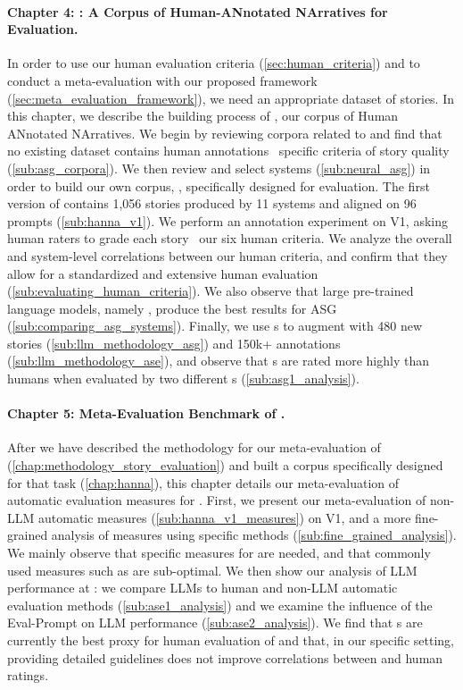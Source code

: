 \paragraph{Chapter 4: \hanna: A Corpus of Human-ANnotated NArratives for {\asg} Evaluation.}
In order to use our human evaluation criteria (\autoref{sec:human_criteria}) and to conduct a meta-evaluation with our proposed framework (\autoref{sec:meta_evaluation_framework}), we need an appropriate dataset of stories. In this chapter, we describe the building process of {\hanna}, our corpus of Human ANnotated NArratives. We begin by reviewing  corpora related to {\asgfull} and find that no existing dataset contains human annotations {\wrt}\ specific criteria of story quality (\autoref{sub:asg_corpora}). We then review and select {\asg} systems (\autoref{sub:neural_asg}) in order to build our own corpus, \hanna, specifically designed for {\asg} evaluation. The first version of {\hanna} contains 1,056 stories produced by 11 systems and aligned on 96 prompts (\autoref{sub:hanna_v1}). We perform an annotation experiment on {\hanna} V1, asking human raters to grade each story {\wrt}\ our six human criteria. We analyze the overall and system-level correlations between our human criteria, and confirm that they allow for a standardized and extensive human evaluation (\autoref{sub:evaluating_human_criteria}). We also observe that large pre-trained language models, namely {\gptt}, produce the best results for ASG (\autoref{sub:comparing_asg_systems}). Finally, we use {\llmfull}s to augment {\hanna} with 480 new stories (\autoref{sub:llm_methodology_asg}) and 150k+ annotations (\autoref{sub:llm_methodology_ase}), and observe that {\llm}s are rated more highly than humans when evaluated by two different {\llm}s (\autoref{sub:asg1_analysis}).

\paragraph{Chapter 5: Meta-Evaluation Benchmark of \asgfull.}
After we have described the methodology for our meta-evaluation of {\asg} (\autoref{chap:methodology_story_evaluation}) and built a corpus specifically designed for that task (\autoref{chap:hanna}), this chapter details our meta-evaluation of automatic evaluation measures for \asgfull. First, we present our meta-evaluation of non-LLM automatic measures (\autoref{sub:hanna_v1_measures}) on {\hanna} V1, and a more fine-grained analysis of measures using specific methods (\autoref{sub:fine_grained_analysis}). We mainly observe that specific measures for {\asefull} are needed, and that commonly used measures such as {\bleu} are sub-optimal. We then show our analysis of LLM performance at {\ase}: we compare LLMs to human and non-LLM automatic evaluation methods (\autoref{sub:ase1_analysis}) and we examine the influence of the Eval-Prompt on LLM performance (\autoref{sub:ase2_analysis}). We find that {\llm}s are currently the best proxy for human evaluation of {\asg} and that, in our specific setting, providing detailed guidelines does not improve correlations between {\llm} and human ratings.


